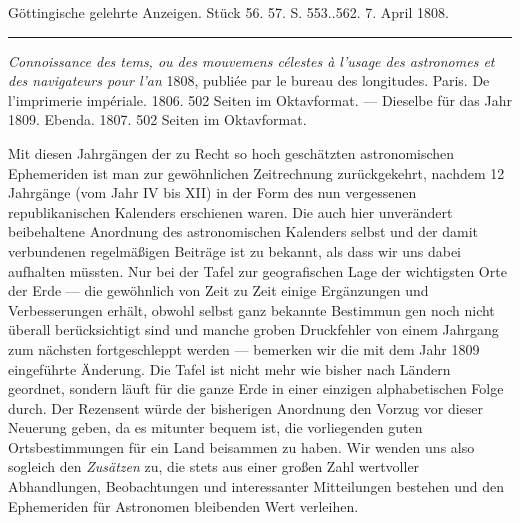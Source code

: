 \clearpage
{}
\hypertarget{native-497-lower}{}\label{native-497-lower}
\begin{center}
\small Göttingische gelehrte Anzeigen. Stück 56. 57. S. 553..562. 7. April 1808.\\[3pt]
\rule{.72\linewidth}{.3pt}
\end{center}

\emph{Connoissance des tems, ou des mouvemens célestes à l'usage des astronomes et des navigateurs pour l'an} 1808, publiée par le bureau des longitudes. Paris. De l'imprimerie impériale. 1806. 502 Seiten im Oktavformat. --- Dieselbe für das Jahr 1809. Ebenda. 1807. 502 Seiten im Oktavformat.

Mit diesen Jahrgängen der zu Recht so hoch geschätzten astronomischen Ephemeriden ist man zur gewöhnlichen Zeitrechnung zurückgekehrt, nachdem 12 Jahrgänge (vom Jahr IV bis XII) in der Form des nun vergessenen republikanischen Kalenders erschienen waren. Die auch hier unverändert beibehaltene Anordnung des astronomischen Kalenders selbst und der damit verbundenen regelmäßigen Beiträge ist zu bekannt, als dass wir uns dabei aufhalten müssten. Nur bei der Tafel zur geografischen Lage der wichtigsten Orte der Erde --- die gewöhnlich von Zeit zu Zeit einige Ergänzungen und Verbesserungen erhält, obwohl selbst ganz bekannte Bestimmun%
%
gen noch nicht überall berücksichtigt sind und manche groben Druckfehler von einem Jahrgang zum nächsten fortgeschleppt werden --- bemerken wir die mit dem Jahr 1809 eingeführte Änderung. Die Tafel ist nicht mehr wie bisher nach Ländern geordnet, sondern läuft für die ganze Erde in einer einzigen alphabetischen Folge durch. Der Rezensent würde der bisherigen Anordnung den Vorzug vor dieser Neuerung geben, da es mitunter bequem ist, die vorliegenden guten Ortsbestimmungen für ein Land beisammen zu haben. Wir wenden uns also sogleich den \emph{Zusätzen} zu, die stets aus einer großen Zahl wertvoller Abhandlungen, Beobachtungen und interessanter Mitteilungen bestehen und den Ephemeriden für Astronomen bleibenden Wert verleihen.


